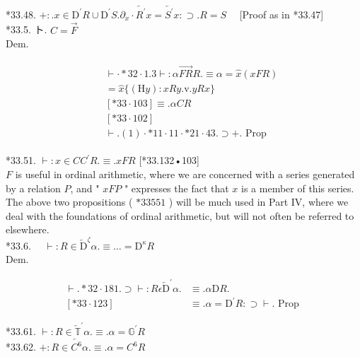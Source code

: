 \documentclass[10pt]{article}
\begin{document}
*33.48. $+: . x \in \mathrm{D}^{\prime} R \cup \mathrm{D}^{\prime} S . \partial_{x} \cdot \overleftarrow{R^{\prime}} x=\overleftarrow{S^{\prime}} x: \supset . R=S \quad$ [Proof as in *33.47]\\
*33.5. ト. $C=\vec{F}$\\
Dem.


\begin{align*}
& \begin{aligned}
& \vdash \cdot * 32 \cdot 1.3 \vdash: \alpha \overrightarrow{F R} R . \equiv \alpha=\widehat{x}(x F R) \\
&=\widehat{x}\{(\mathrm{H} y): x R y . \mathrm{v} . y R x\} \\
& {[* 33 \cdot 103] } \equiv . \alpha C R \\
& {[* 33 \cdot 102] } \\
& \vdash .(1) \cdot * 11 \cdot 11 \cdot * 21 \cdot 43 . \supset+. \text { Prop }
\end{aligned}
\end{align*}


*33.51. $\vdash: x \in C C^{\prime} R . \equiv . x F R$ [*33.132•103]\\
$F$ is useful in ordinal arithmetic, where we are concerned with a series generated by a relation $P$, and " $x F P$ " expresses the fact that $x$ is a member of this series. The above two propositions ( $* 33551$ ) will be much used in Part IV, where we deal with the foundations of ordinal arithmetic, but will not often be referred to elsewhere.\\
*33.6. $\quad \vdash: R \in \overleftarrow{\mathrm{D}}^{\zeta} \alpha . \equiv \ldots=\mathrm{D}^{\kappa} R$\\
Dem.

$$
\begin{aligned}
\vdash . * 32 \cdot 181 . \supset \vdash: R \epsilon \overleftarrow{\mathrm{D}}^{\prime} \alpha . & \equiv . \alpha \mathrm{D} R . \\
{[* 33 \cdot 123] } & \equiv . \alpha=\mathrm{D}^{\prime} R: \supset \vdash . \text { Prop }
\end{aligned}
$$

*33.61. $\vdash: R \in \overleftarrow{\mathbb{T}}^{\prime} \alpha . \equiv . \alpha=\mathbb{G}^{\prime} R$\\
*33.62. $+: R \in \overleftarrow{C^{6}} \alpha . \equiv . \alpha=C^{6} R$
\end{document}
